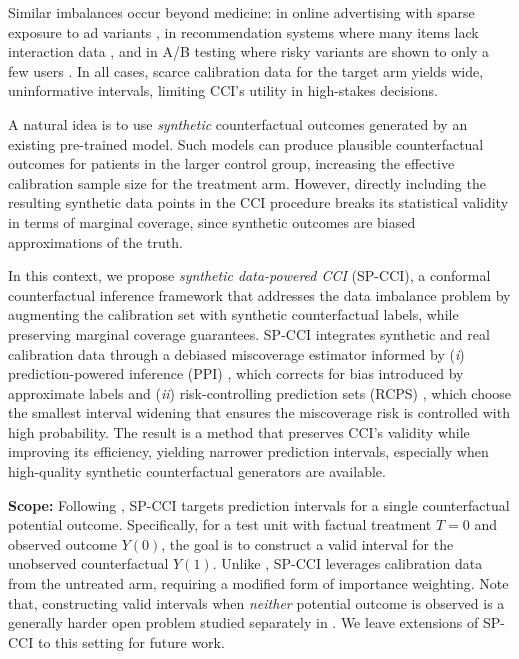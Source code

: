 \documentclass{article}
\theoremstyle{plain}
\theoremstyle{definition}
\theoremstyle{remark}
\begin{document}
Similar imbalances occur beyond medicine: in online advertising with sparse exposure to ad variants \citep{bottou2013counterfactual}, in recommendation systems where many items lack interaction data \citep{swaminathan2015counterfactual}, and in A/B testing where risky variants are shown to only a few users \citep{kohavi2020trustworthy}. In all cases, scarce calibration data for the target arm yields wide, uninformative intervals, limiting CCI's utility in high-stakes decisions.




A natural idea is to use \emph{synthetic} counterfactual outcomes generated by an existing pre-trained model. Such models can produce plausible counterfactual outcomes for patients in the larger control group, increasing the effective calibration sample size for the treatment arm. However, directly including the resulting synthetic data points in the CCI procedure breaks its statistical validity in terms of marginal coverage, since synthetic outcomes are biased approximations of the truth.

In this context, we propose \emph{synthetic data-powered CCI} (SP-CCI), a conformal counterfactual inference framework that addresses the data imbalance problem by augmenting the calibration set with synthetic counterfactual labels, while preserving marginal coverage guarantees. SP-CCI integrates synthetic and real calibration data through a debiased miscoverage estimator informed by (\emph{i}) prediction-powered inference (PPI) \citep{angelopoulos2023prediction}, which corrects for bias introduced by approximate labels and (\emph{ii}) risk-controlling prediction sets (RCPS) \citep{bates2021distribution}, which choose the smallest interval widening that ensures the miscoverage risk is controlled with high probability. The result is a method that preserves CCI's validity while improving its efficiency, yielding narrower prediction intervals, especially when high-quality synthetic counterfactual generators are available.

\textbf{Scope:} Following \citep{lei2021conformal}, SP-CCI targets prediction intervals for a single counterfactual potential outcome. Specifically, for a test unit with factual treatment $T=0$ and observed outcome $Y(0)$, the goal is to construct a valid interval for the unobserved counterfactual $Y(1)$. Unlike \citep{lei2021conformal}, SP-CCI leverages calibration data from the untreated arm, requiring a modified form of importance 
weighting. Note that, constructing valid intervals when \emph{neither} potential outcome is observed is a generally harder open problem studied separately in \citep{lei2021conformal,alaa2023conformal}. We leave extensions of SP-CCI to this setting for future work.
\end{document}
